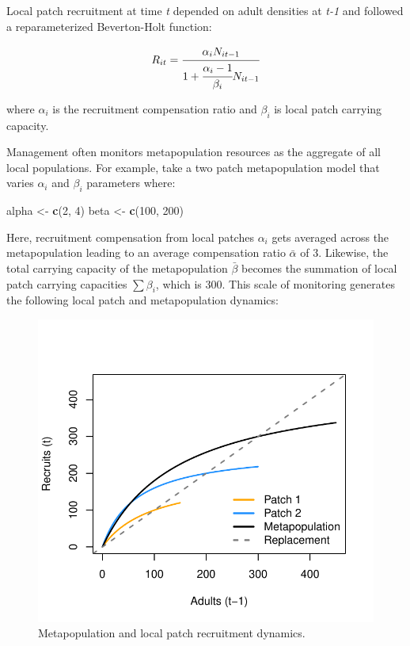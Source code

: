 \documentclass[]{article}
\newenvironment{Shaded}{\begin{snugshade}}{\end{snugshade}}
\newcommand{\DecValTok}[1]{\textcolor[rgb]{0.00,0.00,0.81}{#1}}
\newcommand{\KeywordTok}[1]{\textcolor[rgb]{0.13,0.29,0.53}{\textbf{#1}}}
\newcommand{\NormalTok}[1]{#1}
\newcommand{\StringTok}[1]{\textcolor[rgb]{0.31,0.60,0.02}{#1}}
\begin{document}
Local patch recruitment at time \emph{t} depended on adult densities at
\emph{t-1} and followed a reparameterized Beverton-Holt function:

\begin{align}
R_{it}=\cfrac{\alpha_iN_{it-1}}{1+\cfrac{\alpha_i-1}{\beta_i}N_{it-1}}
\end{align}

where \(\alpha_i\) is the recruitment compensation ratio and \(\beta_i\)
is local patch carrying capacity.

Management often monitors metapopulation resources as the aggregate of
all local populations. For example, take a two patch metapopulation
model that varies \(\alpha_i\) and \(\beta_i\) parameters where:

\begin{Shaded}
\begin{Highlighting}[]
\NormalTok{alpha <-}\StringTok{ }\KeywordTok{c}\NormalTok{(}\DecValTok{2}\NormalTok{, }\DecValTok{4}\NormalTok{)}
\NormalTok{beta <-}\StringTok{ }\KeywordTok{c}\NormalTok{(}\DecValTok{100}\NormalTok{, }\DecValTok{200}\NormalTok{)}
\end{Highlighting}
\end{Shaded}

Here, recruitment compensation from local patches \(\alpha_i\) gets
averaged across the metapopulation leading to an average compensation
ratio \(\bar{\alpha}\) of 3. Likewise, the total carrying capacity of
the metapopulation \(\bar{\beta}\) becomes the summation of local patch
carrying capacities \(\sum\beta_i\), which is 300. This scale of
monitoring generates the following local patch and metapopulation
dynamics:

\begin{figure}[H]

{\centering \includegraphics{Managing_for_ecological_surprises_in_metapopulations_files/figure-latex/recruit curves-1} 

}

\caption{Metapopulation and local patch recruitment dynamics.}\label{fig:recruit curves}
\end{figure}
\end{document}
